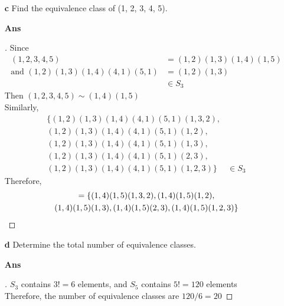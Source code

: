 \documentclass[paper=usletter, fontsize=12pt]{article}
\begin{document}
\begin{itemize}
\begin{itemize}
\begin{itemize}
                \item[\textbf{c}] Find the equivalence class of (1, 2, 3, 4, 5).
                \item[\textbf{Ans}]
                \begin{proof}[\unskip\nopunct]
                    Since
                    \begin{align*}
                        (1,2,3,4,5) & = (1,2)(1,3)(1,4)(1,5)\\
                        \text{and } (1,2)(1,3)(1,4)(4,1)(5,1) & = (1,2)(1,3)\\
                        & \in S_3
                    \end{align*}
                    Then $(1,2,3,4,5) \sim (1,4)(1,5)$\\
                    Similarly,
                    \begin{align*}
                        \{(1,2)(1,3)(1,4)(4,1)(5,1)(1,3,2), & \\
                        (1,2)(1,3)(1,4)(4,1)(5,1)(1,2), & \\
                        (1,2)(1,3)(1,4)(4,1)(5,1)(1,3), & \\
                        (1,2)(1,3)(1,4)(4,1)(5,1)(2,3), & \\
                        (1,2)(1,3)(1,4)(4,1)(5,1)(1,2,3)\} & \in S_3
                    \end{align*}
                    Therefore,
                    \begin{multline*}
                        [(1,2,3,4,5)] = \{(1,4)(1,5)(1,3,2), (1,4)(1,5)(1,2),\\(1,4)(1,5)(1,3), (1,4)(1,5)(2,3), (1,4)(1,5)(1,2,3)\} \qedhere
                    \end{multline*}
                \end{proof}
                \vspace{0.2in}

                \item[\textbf{d}] Determine the total number of equivalence
                classes.
                \item[\textbf{Ans}]
                \begin{proof}[\unskip\nopunct]
                    $S_3$ contains $3!=6$ elements, and $S_5$ contains $5!=120$
                    elements\\ Therefore, the number of equivalence classes are
                    $120/6=20$ \qedhere
                \end{proof}
                \vspace{0.2in}

            \end{itemize}

        \end{itemize}

    \end{itemize}
\end{document}
